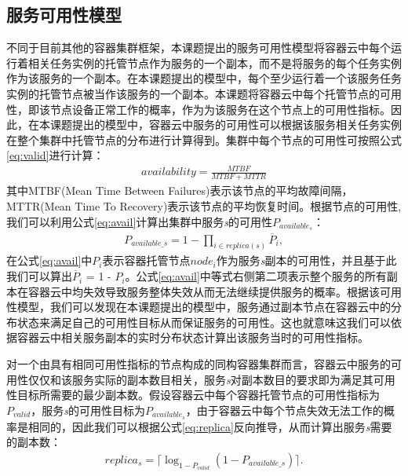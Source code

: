 \subsection{服务可用性模型}\label{sec:availability_model}
不同于目前其他的容器集群框架，本课题提出的服务可用性模型将容器云中每个运行着相关任务实例的托管节点作为服务的一个副本，而不是将服务的每个任务实例作为该服务的一个副本。在本课题提出的模型中，每个至少运行着一个该服务任务实例的托管节点被当作该服务的一个副本。本课题将容器云中每个托管节点的可用性，即该节点设备正常工作的概率，作为为该服务在这个节点上的可用性指标。因此，在本课题提出的模型中，容器云中服务的可用性可以根据该服务相关任务实例在整个集群中托管节点的分布进行计算得到。集群中每个节点的可用性可按照公式\ref{eq:valid}进行计算：
\begin{equation}\label{eq:valid}
\begin{split}
availability = \frac{MTBF}{MTBF + MTTR}
\end{split}
\end{equation}
其中MTBF(Mean Time Between Failures)表示该节点的平均故障间隔，MTTR(Mean Time To Recovery)表示该节点的平均恢复时间。根据节点的可用性, 我们可以利用公式\ref{eq:avail}计算出集群中服务\emph{s}的可用性$P_{available_s}$：
\begin{equation}\label{eq:avail}
\begin{split}
P_{available\_s} = 1 - \prod_{i \in {replica(s)}} \overline P_{i},
\end{split}
\end{equation}
在公式\ref{eq:avail}中$P_{i}$表示容器托管节点$node_i$作为服务\emph{s}副本的可用性，并且基于此我们可以算出$\overline P_{i}$ = 1 - $P_{i}$。公式\ref{eq:avail}中等式右侧第二项表示整个服务的所有副本在容器云中均失效导致服务整体失效从而无法继续提供服务的概率。根据该可用性模型，我们可以发现在本课题提出的模型中，服务通过副本节点在容器云中的分布状态来满足自己的可用性目标从而保证服务的可用性。这也就意味这我们可以依据容器云中相关服务副本的实时分布状态计算出该服务当时的可用性指标。

对一个由具有相同可用性指标的节点构成的同构容器集群而言，容器云中服务的可用性仅仅和该服务实际的副本数目相关，服务\emph{s}对副本数目的要求即为满足其可用性目标所需要的最少副本数。假设容器云中每个容器托管节点的可用性指标为$P_{valid}$，服务\emph{s}的可用性目标为$P_{available_s}$，由于容器云中每个节点失效无法工作的概率是相同的，因此我们可以根据公式\ref{eq:replica}反向推导，从而计算出服务\emph{s}需要的副本数：
\begin{equation}\label{eq:replica}
\begin{split}
replica_s = \lceil \log_{1-P_{valid}} ( 1 - P_{available\_s} )\rceil.
\end{split}
\end{equation}

